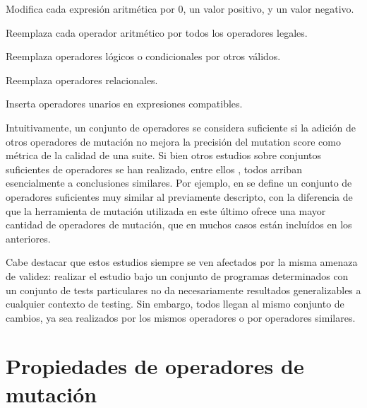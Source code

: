 \begin{description}[leftmargin=8em,style=nextline]
	\item[ABS] Modifica cada expresi\'on aritm\'etica por 0, un valor positivo, y un valor negativo.
	\item[AOR] Reemplaza cada operador aritm\'etico por todos los operadores legales.
	\item[LCR] Reemplaza operadores l\'ogicos o condicionales por otros v\'alidos.
	\item[ROR] Reemplaza operadores relacionales.
	\item[UOI] Inserta operadores unarios en expresiones compatibles.
\end{description}

Intuitivamente, un conjunto de operadores se considera suficiente si la adici\'on de otros operadores de mutaci\'on no mejora la precisi\'on del mutation score como m\'etrica de la calidad de una suite. Si bien otros estudios sobre conjuntos suficientes de operadores se han realizado, entre ellos \cite{bibliography.mutation.selection.ASN2008}, todos arriban esencialmente a conclusiones similares. Por ejemplo, en \cite{bibliography.mutation.selection.ASN2008} se define un conjunto de operadores suficientes muy similar al previamente descripto, con la diferencia de que la herramienta de mutaci\'on utilizada en este \'ultimo ofrece una mayor cantidad de operadores de mutaci\'on, que en muchos casos est\'an inclu\'idos en los anteriores.

Cabe destacar que estos estudios siempre se ven afectados por la misma amenaza de validez: realizar el estudio bajo un conjunto de programas determinados con un conjunto de tests particulares no da necesariamente resultados generalizables a cualquier contexto de testing. Sin embargo, todos llegan al mismo conjunto de cambios, ya sea realizados por los mismos operadores o por operadores similares.

\pagebreak

\section{Propiedades de operadores de mutaci\'on}
\label{sec:preliminares.mutation.opevaluation}

